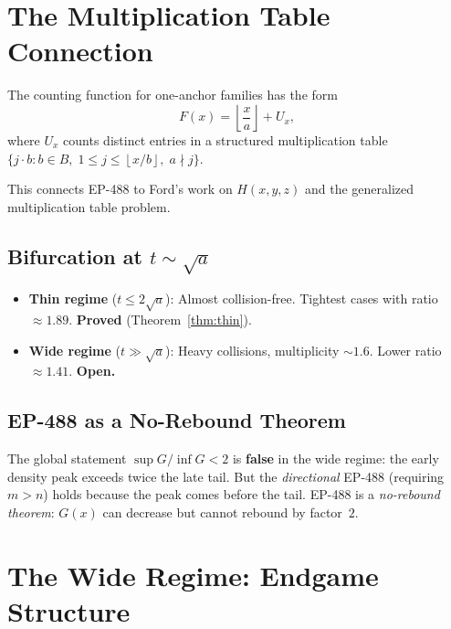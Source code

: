 \documentclass[11pt,a4paper]{article}
\theoremstyle{definition}
\newcommand{\floor}[1]{\left\lfloor #1 \right\rfloor}
\begin{document}
\section{The Multiplication Table Connection}

The counting function for one-anchor families has the form
\[
F(x) = \floor{\frac{x}{a}} + U_x,
\]
where $U_x$ counts distinct entries in a structured multiplication table
$\{j \cdot b : b \in B,\; 1 \leq j \leq \floor{x/b},\; a \nmid j\}$.

This connects EP-488 to Ford's work on $H(x,y,z)$ and the 
generalized multiplication table problem.

\subsection{Bifurcation at $t \sim \sqrt{a}$}

\begin{itemize}
\item \textbf{Thin regime} ($t \leq 2\sqrt{a}$): Almost collision-free. 
Tightest cases with ratio $\approx 1.89$. \textbf{Proved} 
(Theorem~\ref{thm:thin}).
\item \textbf{Wide regime} ($t \gg \sqrt{a}$): Heavy collisions, 
multiplicity $\sim 1.6$. Lower ratio $\approx 1.41$. \textbf{Open.}
\end{itemize}

\subsection{EP-488 as a No-Rebound Theorem}

The global statement $\sup G / \inf G < 2$ is \textbf{false} in the wide 
regime: the early density peak exceeds twice the late tail. But the 
\emph{directional} EP-488 (requiring $m > n$) holds because the peak 
comes before the tail. EP-488 is a \emph{no-rebound theorem}: $G(x)$ 
can decrease but cannot rebound by factor~$2$.

\section{The Wide Regime: Endgame Structure}
\end{document}
